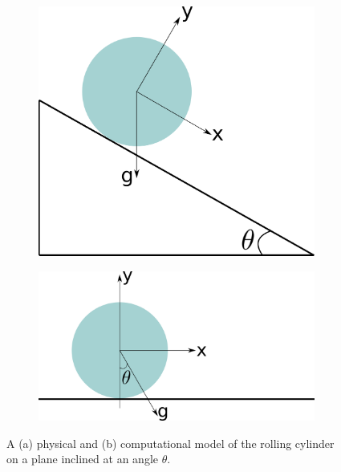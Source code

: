 \begin{figure}[!htpb]
  \centering
  \begin{subfigure}{0.48\textwidth}
    \centering
    \includegraphics[width=1.0\textwidth]{images/rfc/images/de_2021_cylinder_rolling_on_an_inclined_plane/schematic_1}
    \subcaption{}\label{fig:circular-body:schematic-1}
  \end{subfigure}
  \begin{subfigure}{0.48\textwidth}
    \centering
    \includegraphics[width=1.0\textwidth]{images/rfc/images/de_2021_cylinder_rolling_on_an_inclined_plane/schematic_2}
    \subcaption{}\label{fig:circular-body:schematic-2}
  \end{subfigure}
  \caption{A (a) physical and (b) computational model of the rolling cylinder on a
    plane inclined at an angle $\theta$.}
\label{fig:circular-body-schematic}
\end{figure}
